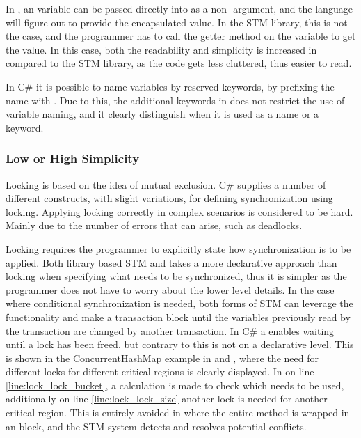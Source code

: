 In \stmname, an  variable can be passed directly into as a non- argument, and the language will figure out to provide the encapsulated value. In the \ac{STM} library, this is not the case, and the programmer has to call the getter method on the  variable to get the value. In this case, both the readability and simplicity is increased in \stmname compared to the \ac{STM} library, as the code gets less cluttered, thus easier to read.

In C\# it is possible to name variables by reserved keywords, by prefixing the name with . Due to this, the additional keywords in \stmname does not restrict the use of variable naming, and it clearly distinguish when it is used as a name or a keyword.

\subsubsection{Low or High Simplicity}\label{subsec:simplicity}
Locking is based on the idea of mutual exclusion. C\# supplies a number of different constructs, with slight variations, for defining synchronization using locking. Applying locking correctly in complex scenarios is considered to be hard\cite[p. 56]{sutter2005software}. Mainly due to the number of errors that can arise, such as deadlocks. 

Locking requires the programmer to explicitly state how synchronization is to be applied. Both library based \ac{STM} and \stmname takes a more declarative approach than locking when specifying what needs to be synchronized, thus it is simpler as the programmer does not have to worry about the lower level details. In the case where conditional synchronization is needed, both forms of \ac{STM} can leverage the  functionality and make a transaction block until the variables previously read by the transaction are changed by another transaction. In C\# a  enables waiting until a lock has been freed, but contrary to  this is not on a declarative level. This is shown in the ConcurrentHashMap example in  and , where the need for different locks for different critical regions is clearly displayed. In  on line \ref{line:lock_lock_bucket}, a calculation is made to check which needs to be used, additionally on line \ref{line:lock_lock_size} another lock is needed for another critical region. This is entirely avoided in  where the entire method is wrapped in an  block, and the \ac{STM} system detects and resolves potential conflicts.

